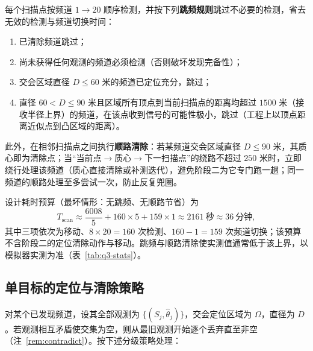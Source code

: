 \documentclass[12pt,a4paper]{ctexart}
\numberwithin{figure}{section}
\numberwithin{table}{section}
\numberwithin{equation}{section}
\begin{document}
每个扫描点按频道 $1\to20$ 顺序检测，并按下列\textbf{跳频规则}跳过不必要的检测，省去无效的检测与频道切换时间：
\begin{enumerate}[label=\textbf{(\arabic*)}]
\item 已清除频道跳过；
\item 尚未获得任何观测的频道必须检测（否则破坏发现完备性）；
\item 交会区域直径 $D\le60$ 米的频道已定位充分，跳过；
\item 直径 $60<D\le90$ 米且区域所有顶点到当前扫描点的距离均超过 $1500$ 米（接收半径上界）的频道，在该点收到信号的可能性极小，跳过（工程上以顶点距离近似点到凸区域的距离）。
\end{enumerate}

此外，在相邻扫描点之间执行\textbf{顺路清除}：若某频道交会区域直径 $D\le90$ 米，其质心即为清除点；当“当前点$\to$质心$\to$下一扫描点”的绕路不超过 $250$ 米时，立即绕行处理该频道（质心直接清除或补测迭代），避免阶段二为它专门跑一趟；同一频道的顺路处理至多尝试一次，防止反复兜圈。

设计耗时预算（最坏情形：无跳频、无顺路节省）为
\begin{equation}
T_{\mathrm{scan}}\approx\frac{6008}{5}+160\times5+159\times1\approx2161\ \text{秒}\approx36\ \text{分钟},
\label{eq:scan-budget}
\end{equation}
其中三项依次为移动、$8\times20=160$ 次检测、$160-1=159$ 次频道切换；该预算不含阶段二的定位清除动作与移动。跳频与顺路清除使实测值通常低于该上界，以模拟器实测为准（表~\ref{tab:q3-stats}）。

\subsection{单目标的定位与清除策略}

对某个已发现频道，设其全部观测为 $\{(S_j,\hat{\theta}_j)\}$，交会定位区域为 $\Omega$，直径为 $D$。若观测相互矛盾使交集为空，则从最旧观测开始逐个丢弃直至非空（注~\ref{rem:contradict}）。按下述分级策略处理：
\end{document}
